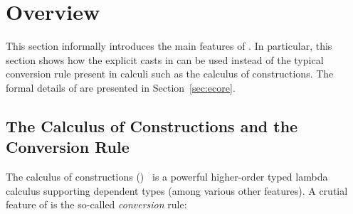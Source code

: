 \newcommand{\framedhslinecorrect}[2]%
  {#1[#2]}

\newcommand{\framedhs}{\sethscode{framedhscode}}


\newenvironment{inlinehscode}%
  {\(\def\column##1##2{}%
   \let\>\undefined\let\<\undefined\let\\\undefined
   \newcommand\>[1][]{}\newcommand\<[1][]{}\newcommand\\[1][]{}%
   \def\fromto##1##2##3{##3}%
   \def\nextline{}}{\) }%

\newcommand{\inlinehs}{\sethscode{inlinehscode}}


\newenvironment{joincode}%
  {\let\orighscode=\hscode
   \let\origendhscode=\endhscode
   \def\endhscode{\def\hscode{\endgroup\def\@currenvir{hscode}\\}\begingroup}
   \orighscode\def\hscode{\endgroup\def\@currenvir{hscode}}}%
  {\origendhscode
   \global\let\hscode=\orighscode
   \global\let\endhscode=\origendhscode}%

\makeatother
\EndFmtInput
%

\section{Overview}

This section informally introduces the main features of \name. In
particular, this section shows how the explicit casts in \name can be
used instead of the typical conversion rule present in calculi such as
the calculus of constructions. The formal details of \name are
presented in Section~\ref{sec:ecore}. 

\subsection{The Calculus of Constructions and the Conversion Rule}
\label{sec:coc}

The calculus of constructions (\coc)~\cite{coc} is a powerful
higher-order typed lambda calculus supporting dependent types (among
various other features).  A crutial
feature of \coc is the so-called \emph{conversion}
rule: \ottusedrule{\ottdruleTccXXConv{}}

